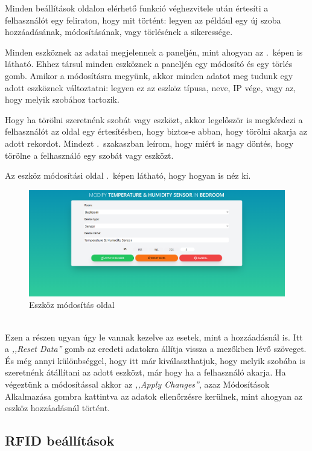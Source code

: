 \documentclass[
]{thesis-ekf}
\theoremstyle{definition}
\theoremstyle{remark}
\begin{document}
	Minden beállítások oldalon elérhető funkció véghezvitele után értesíti a felhasználót egy feliraton, hogy mit történt: legyen az például egy új szoba hozzáadásának, módosításának, vagy törlésének a sikeressége.
	
	Minden eszköznek az adatai megjelennek a paneljén, mint ahogyan az .~képen is látható. Ehhez társul minden eszköznek a paneljén egy módosító és egy törlés gomb. Amikor a módosításra megyünk, akkor minden adatot meg tudunk egy adott eszköznek változtatni: legyen ez az eszköz típusa, neve, IP vége, vagy az, hogy melyik szobához tartozik.
	
	Hogy ha törölni szeretnénk szobát vagy eszközt, akkor legelőször is megkérdezi a felhasználót az oldal egy értesítésben, hogy biztos-e abban, hogy törölni akarja az adott rekordot. Mindezt .~szakaszban leírom, hogy miért is nagy döntés, hogy törölne a felhasználó egy szobát vagy eszközt.
	
	Az eszköz módosítási oldal .~képen látható, hogy hogyan is néz ki.
	\begin{figure}[ht!]
		\centering
		\includegraphics[width=1\textwidth]{./src/pages_img/modify-sensor-in-bedroom}
		\caption{Eszköz módosítás oldal}
		\label{modify}
	\end{figure}\\
	Ezen a részen ugyan úgy le vannak kezelve az esetek, mint a hozzáadásnál is. Itt a \emph{,,Reset Data''} gomb az eredeti adatokra állítja vissza a mezőkben lévő szöveget. És még annyi különbséggel, hogy itt már kiválaszthatjuk, hogy melyik szobába is szeretnénk átállítani az adott eszközt, már hogy ha a felhasználó akarja. Ha végeztünk a módosítással akkor az \emph{,,Apply Changes''}, azaz Módosítások Alkalmazása gombra kattintva az adatok ellenőrzésre kerülnek, mint ahogyan az eszköz hozzáadásnál történt.
	
	\subsection{RFID beállítások}
\end{document}
